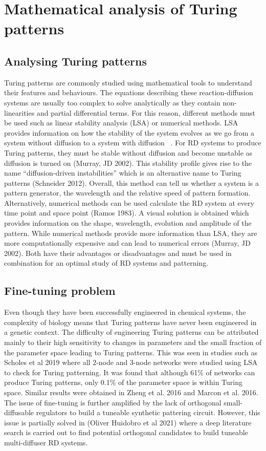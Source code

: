 \section{Mathematical analysis of Turing patterns}

\subsection{Analysing Turing patterns}
Turing patterns are commonly studied using mathematical tools to understand their features and behaviours.
The equations describing these reaction-diffusion systems are usually too complex to solve analytically as they contain non-linearities and partial differential terms.
For this reason, different methods must be used such as linear stability analysis (LSA) or numerical methods.
LSA provides information on how the stability of the system evolves as we go from a system without diffusion to a system with diffusion ~\parencite{Glendinning1994}.
For RD systems to produce Turing patterns, they must be stable without diffusion and become unstable as diffusion is turned on (Murray, JD 2002).
This stability profile gives rise to the name “diffusion-driven instabilities” which is an alternative name to Turing patterns (Schneider 2012).
Overall, this method can tell us whether a system is a pattern generator, the wavelength and the relative speed of pattern formation.
Alternatively, numerical methods can be used calculate the RD system at every time point and space point (Ramos 1983).
A visual solution is obtained which provides information on the shape, wavelength, evolution and amplitude of the pattern.
While numerical methods provide more information than LSA, they are more computationally expensive and can lead to numerical errors (Murray, JD 2002).
Both have their advantages or disadvantages and must be used in combination for an optimal study of RD systems and patterning.
\subsection{Fine-tuning problem}
Even though they have been successfully engineered in chemical systems, the complexity of biology means that Turing patterns have never been engineered in a genetic context. 
The difficulty of engineering Turing patterns can be attributed mainly to their high sensitivity to changes in parameters and the small fraction of the parameter space leading to Turing patterns. 
This was seen in studies such as Scholes et al 2019 where all 2-node and 3-node networks were studied using LSA to check for Turing patterning.
It was found that although 61\% of networks can produce Turing patterns, only 0.1\% of the parameter space is within Turing space. 
Similar results were obtained in Zheng et al. 2016 and Marcon et al. 2016. 
The issue of fine-tuning is further amplified by the lack of orthogonal small-diffusable regulators to build a tuneable synthetic pattering circuit. 
However, this issue is partially solved in (Oliver Huidobro et al 2021) where a deep literature search is carried out to find potential orthogonal candidates to build tuneable multi-diffuser RD systems.

